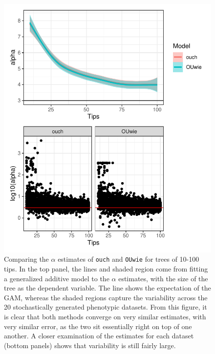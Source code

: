 \documentclass[12pt,reqno,final]{amsart}\usepackage[]{graphicx}\usepackage[]{color}
\makeatletter
\def\maxwidth{ %
  \ifdim\Gin@nat@width>\linewidth
    \linewidth
  \else
    \Gin@nat@width
  \fi
}
\newenvironment{kframe}{%
 \def\at@end@of@kframe{}%
 \ifinner\ifhmode%
  \def\at@end@of@kframe{\end{minipage}}%
  \begin{minipage}{\columnwidth}%
 \fi\fi%
 \def\FrameCommand##1{\hskip\@totalleftmargin \hskip-\fboxsep
 \colorbox{shadecolor}{##1}\hskip-\fboxsep
     \hskip-\linewidth \hskip-\@totalleftmargin \hskip\columnwidth}%
 \MakeFramed {\advance\hsize-\width
   \@totalleftmargin\z@ \linewidth\hsize
   \@setminipage}}%
 {\par\unskip\endMakeFramed%
 \at@end@of@kframe}
\newenvironment{knitrout}{}{} %
\theoremstyle{plain}
\numberwithin{equation}{part}
\makeatother
\begin{document}
\begin{knitrout}
\color{fgcolor}\begin{kframe}


{\ttfamily\noindent\itshape{}}\end{kframe}\begin{figure}
\includegraphics[width=\maxwidth]{figure/unnamed-chunk-1-1} \caption[Comparing the $\alpha$ estimates of \texttt{ouch} and \texttt{OUwie} for trees of 10-100 tips]{Comparing the $\alpha$ estimates of \texttt{ouch} and \texttt{OUwie} for trees of 10-100 tips. In the top panel, the lines and shaded region come from fitting a generalized additive model to the $\alpha$ estimates, with the size of the tree as the dependent variable. The line shows the expectation of the GAM, whereas the shaded regions capture the variability across the 20 stochastically generated phenotypic datasets. From this figure, it is clear that both methods converge on very similar estimates, with very similar error, as the two sit essentially right on top of one another. A closer examination of the estimates for each dataset (bottom panels) shows that variability is still fairly large.}\label{fig:unnamed-chunk-1}
\end{figure}


\end{knitrout}
\end{document}
